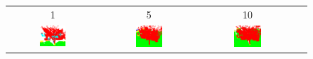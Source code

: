     \begin{figure}[h!]
        \begin{tabular}{cccc}
            1 & 5 & 10 \\
            \includegraphics[width=0.30\textwidth, height=0.15\textheight]{images/seg_output/deep_ensembles/1_1.pdf} &
            \includegraphics[width=0.30\textwidth, height=0.15\textheight]{images/seg_output/deep_ensembles/1_5.pdf}& 
            \includegraphics[width=0.30\textwidth, height=0.15\textheight]{images/seg_output/deep_ensembles/1_10.pdf}\\


\end{tabular}
\end{figure}
